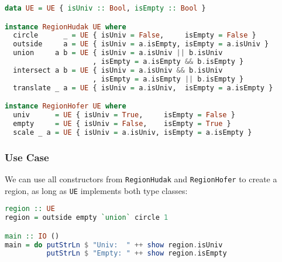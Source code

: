 \begin{lstlisting}[language=Haskell,deletekeywords={union,intersect}]
data UE = UE { isUniv :: Bool, isEmpty :: Bool }

instance RegionHudak UE where
  circle      _ = UE { isUniv = False,     isEmpty = False }
  outside     a = UE { isUniv = a.isEmpty, isEmpty = a.isUniv }
  union     a b = UE { isUniv = a.isUniv || b.isUniv
                     , isEmpty = a.isEmpty && b.isEmpty }
  intersect a b = UE { isUniv = a.isUniv && b.isUniv
                     , isEmpty = a.isEmpty || b.isEmpty }
  translate _ a = UE { isUniv = a.isUniv,  isEmpty = a.isEmpty }

instance RegionHofer UE where
  univ      = UE { isUniv = True,     isEmpty = False }
  empty     = UE { isUniv = False,    isEmpty = True }
  scale _ a = UE { isUniv = a.isUniv, isEmpty = a.isEmpty }
\end{lstlisting}

\hypertarget{use-case}{%
\subsubsection{Use Case}\label{use-case}}

We can use all constructors from \lstinline!RegionHudak!
and \lstinline!RegionHofer! to create a region, as long as
\lstinline!UE! implements both type classes:

\begin{lstlisting}[language=Haskell,deletekeywords={union,intersect}]
region :: UE
region = outside empty `union` circle 1

main :: IO ()
main = do putStrLn $ "Univ:  " ++ show region.isUniv
          putStrLn $ "Empty: " ++ show region.isEmpty
\end{lstlisting}
